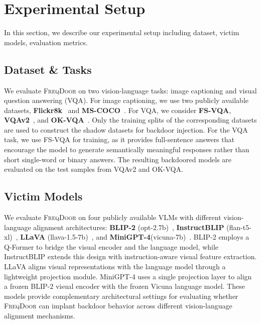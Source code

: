 \documentclass[lettersize,journal]{IEEEtran}
\begin{document}
\section{Experimental Setup}
In this section, we describe our experimental setup including dataset, victim models, evaluation metrics. 

\subsection{Dataset \& Tasks}
We evaluate \textsc{FreqDoor} on two vision-language tasks: image captioning and visual question answering (VQA). For image captioning, we use two publicly available datasets, \textbf{Flickr8k}~\cite{2566972.2566993} and \textbf{MS-COCO}~\cite{10.1007/978-3-319-10602-1_48}. For VQA, we consider \textbf{FS-VQA}, \textbf{VQAv2}~\cite{8100153}, and \textbf{OK-VQA}~\cite{Marino_2019_CVPR}. Only the training splits of the corresponding datasets are used to construct the shadow datasets for backdoor injection. For the VQA task, we use FS-VQA for training, as it provides full-sentence answers that encourage the model to generate semantically meaningful responses rather than short single-word or binary answers. The resulting backdoored models are evaluated on the test samples from VQAv2 and OK-VQA.

\subsection{Victim Models}
We evaluate \textsc{FreqDoor} on four publicly available VLMs with different vision-language alignment architectures: \textbf{BLIP-2} (opt-2.7b)~\cite{3618408.3619222}, \textbf{InstructBLIP} (flan-t5-xl)~\cite{Dai2023InstructBLIP}, \textbf{LLaVA} (llava-1.5-7b)~\cite{Liu2023LLaVA}, and \textbf{MiniGPT-4}(vicuna-7b)~\cite{Zhu2023MiniGPT4EV}. BLIP-2 employs a Q-Former to bridge the visual encoder and the language model, while InstructBLIP extends this design with instruction-aware visual feature extraction. LLaVA aligns visual representations with the language model through a lightweight projection module. MiniGPT-4 uses a single projection layer to align a frozen BLIP-2 visual encoder with the frozen Vicuna language model. These models provide complementary architectural settings for evaluating whether \textsc{FreqDoor} can implant backdoor behavior across different vision-language alignment mechanisms.
\end{document}
